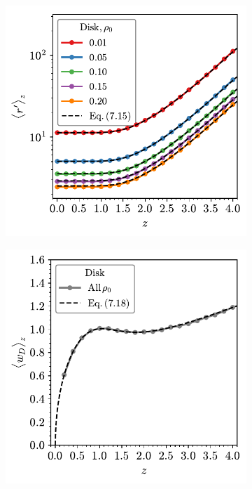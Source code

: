 \begin{figure}
     \vspace{2mm}
     \begin{subfigure}[b]{0.45\textwidth}
         \centering
         \includegraphics[width=\textwidth]{./figures/quasi2d/d_z_3d_disk.pdf}
         \caption{}
         \label{fig:wdc}
     \end{subfigure}
     \hfill
      \begin{subfigure}[b]{0.45\textwidth}
         \centering
         \includegraphics[width=\textwidth]{./figures/quasi2d/w_z_3d_disk.pdf}
         \caption{}
         \label{fig:wdd}
     \end{subfigure}
     \hfill
	

\end{figure}
